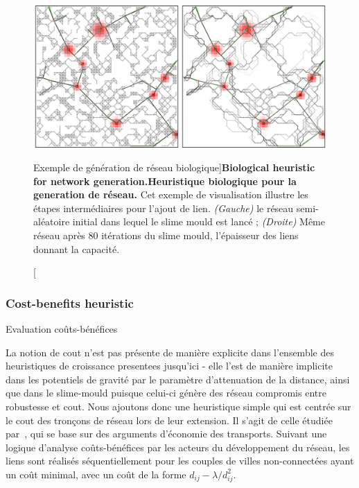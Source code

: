 \begin{figure}
\includegraphics[width=\linewidth]{Figures/Final/7-1-1-fig-networkgrowth-bioexample.jpg}
\caption[Biological Network Example][Exemple de génération de réseau biologique]{\textbf{Biological heuristic for network generation.}\label{fig:networkgrowth:bioexample}}{\textbf{Heuristique biologique pour la generation de réseau.} Cet exemple de visualisation illustre les étapes intermédiaires pour l'ajout de lien. \textit{(Gauche)} le réseau semi-aléatoire initial dans lequel le slime mould est lancé ; \textit{(Droite)} Même réseau après 80 itérations du slime mould, l'épaisseur des liens donnant la capacité.\label{fig:networkgrowth:bioexample}}
\end{figure}


\subsubsection{Cost-benefits heuristic}{Evaluation coûts-bénéfices}

La notion de cout n'est pas présente de manière explicite dans l'ensemble des heuristiques de croissance presentees jusqu'ici - elle l'est de manière implicite dans les potentiels de gravité par le paramètre d'attenuation de la distance, ainsi que dans le slime-mould puisque celui-ci génère des réseau compromis entre robustesse et cout. Nous ajoutons donc une heuristique simple qui est centrée sur le cout des tronçons de réseau lors de leur extension. Il s'agit de celle étudiée par~\cite{louf2013emergence}, qui se base sur des arguments d'économie des transports. Suivant une logique d'analyse coûts-bénéfices par les acteurs du développement du réseau, les liens sont réalisés séquentiellement pour les couples de villes non-connectées ayant un coût minimal, avec un coût de la forme $d_{ij} - \lambda / d_{ij}^2$.


